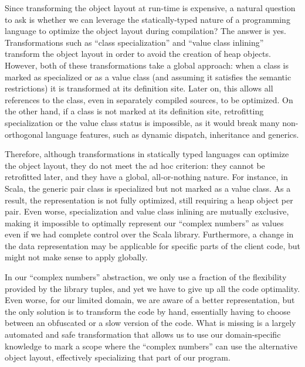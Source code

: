 
Since transforming the object layout at run-time is expensive, a
natural question to ask is whether we can leverage the
statically-typed nature of a programming language to optimize the
object layout during compilation? The answer is yes. Transformations such as ``class
specialization'' and ``value class inlining'' transform the object
layout in order to avoid the creation of heap objects. However, both
of these transformations take a global approach: when a class is
marked as specialized or as a value class (and assuming it satisfies the
semantic restrictions) it is transformed at its definition site. Later
on, this allows all references to the class, even in separately
compiled sources, to be optimized. On the other hand,
if a class is not marked at its definition site, retrofitting
specialization or the value class status is impossible, as it would
break many non-orthogonal language features, such as dynamic dispatch,
inheritance and generics.

Therefore, although transformations in statically typed languages can
optimize the object layout, they do not meet the ad hoc criterion:
they cannot be retrofitted later, and they have a global, all-or-nothing
nature. For instance, in Scala, the generic pair class is specialized
but not marked as a value class. As a result, the representation is
not fully optimized, still requiring a heap object per pair. Even
worse, specialization and value class inlining are mutually exclusive,
making it impossible to optimally represent our ``complex numbers''
as values even if we had complete control over the Scala library.
Furthermore, a change in the data representation may be applicable for
specific parts of the client code, but might not make sense to apply globally.

In our ``complex numbers'' abstraction, we only
use a fraction of the flexibility provided by the library tuples, and
yet we have to give up all the code optimality. Even worse, for our
limited domain, we are aware of a better representation, but
the only solution is to transform the code by hand, essentially having
to choose between an obfuscated or a slow version of the code. What is
missing is a largely automated and safe transformation that allows us
to use our domain-specific knowledge to mark a scope where the
``complex numbers'' can use the alternative object layout, effectively
specializing that part of our program.

